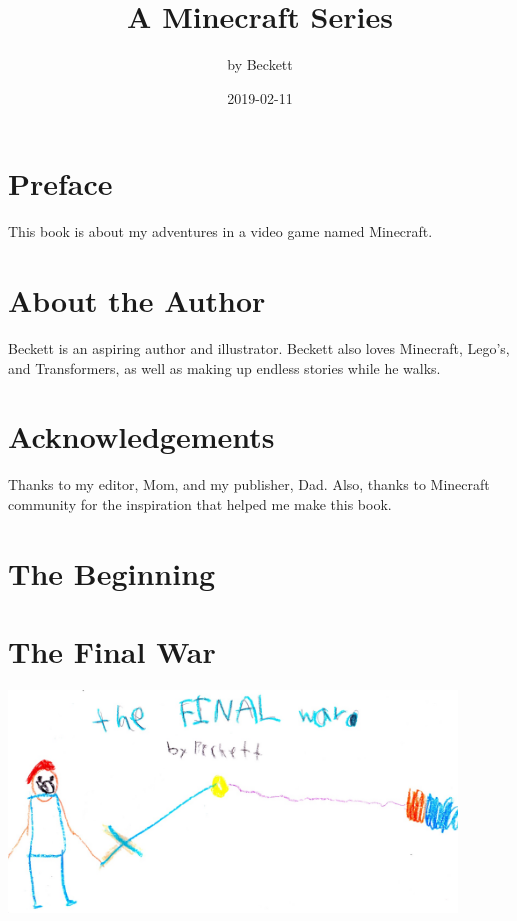 \documentclass[booklet, twoside, 12pt]{krantz}
\title{A Minecraft Series}
\author{by Beckett}
\date{2019-02-11}
\begin{document}
\maketitle

{
\setcounter{tocdepth}{1}
\tableofcontents
}
\hypertarget{preface}{%
\chapter*{Preface}\label{preface}}


This book is about my adventures in a video game named Minecraft.

\hypertarget{about-the-author}{%
\chapter*{About the Author}\label{about-the-author}}


Beckett is an aspiring author and illustrator. Beckett also loves
Minecraft, Lego's, and Transformers, as well as making up endless
stories while he walks.

\hypertarget{acknowledgements}{%
\chapter*{Acknowledgements}\label{acknowledgements}}


Thanks to my editor, Mom, and my publisher, Dad. Also, thanks to
Minecraft community for the inspiration that helped me make this book.

\hypertarget{the-beginning}{%
\chapter{The Beginning}\label{the-beginning}}

\hypertarget{the-final-war}{%
\chapter{The Final War}\label{the-final-war}}

\includegraphics[width=4.6875in,height=\textheight]{img/final-war/final-war.jpg}
\end{document}
